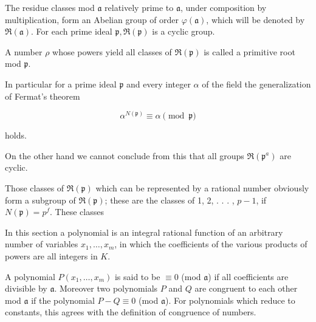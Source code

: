 The residue classes mod $\mathfrak{a}$ relatively prime to $\mathfrak{a}$, under composition by multiplication, form an Abelian group of order $\varphi(\mathfrak{a})$, which will be denoted by $\mathfrak{R}(\mathfrak{a})$. For each prime ideal $\mathfrak{p}, \mathfrak{R}(\mathfrak{p})$ is a cyclic group.

A number $\rho$ whose powers yield all classes of $\mathfrak{R}(\mathfrak{p})$ is called a primitive root mod $\mathfrak{p}$.

In particular for a prime ideal $\mathfrak{p}$ and every integer $\alpha$ of the field the generalization of Fermat’s theorem

$$\alpha^{N(\mathfrak{p})} \equiv \alpha \pmod{\mathfrak{p}}$$

holds.

On the other hand we cannot conclude from this that all groups $\mathfrak{R}(\mathfrak{p}^a)$ are cyclic.

Those classes of $\mathfrak{R}(\mathfrak{p})$ which can be represented by a rational number obviously form a subgroup of $\mathfrak{R}(\mathfrak{p})$; these are the classes of 1, 2, . . . , $p - 1$, if $N(\mathfrak{p}) = p^f$. These classes

In this section a polynomial is an integral rational function of an arbitrary number of variables $x_1, \ldots, x_m$, in which the coefficients of the various products of powers are all integers in $K$.

A polynomial $P(x_1, \ldots, x_m)$ is said to be $\equiv 0$ (mod $\mathfrak{a}$) if all coefficients are divisible by $\mathfrak{a}$. Moreover two polynomials $P$ and $Q$ are congruent to each other mod $\mathfrak{a}$ if the polynomial $P - Q \equiv 0$ (mod $\mathfrak{a}$). For polynomials which reduce to constants, this agrees with the definition of congruence of numbers.
